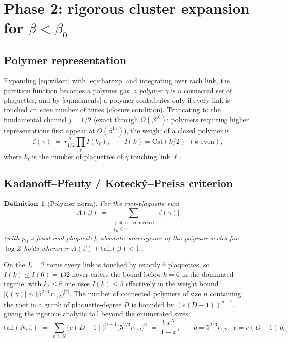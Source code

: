 \documentclass[11pt,a4paper]{article}
\newtheorem{definition}[theorem]{Definition}
\newcommand{\betaZ}{\beta_0}
\begin{document}
\section{Phase 2: rigorous cluster expansion for $\beta < \betaZ$}
\label{sec:phase2}

\subsection{Polymer representation}
\label{sec:polymer}

Expanding \cref{eq:wilson} with \cref{eq:charexp} and integrating over each
link, the partition function becomes a polymer gas: a \emph{polymer} $\gamma$
is a connected set of plaquettes, and by \cref{eq:moments} a polymer
contributes only if every link is touched an \emph{even} number of times
(closure condition).  Truncating to the fundamental channel $j = 1/2$
(exact through $O(\beta^{10})$: polymers requiring higher representations
first appear at $O(\beta^{11})$), the weight of a closed polymer is
\begin{equation}
  \zeta(\gamma) \;=\; r_{1/2}^{|\gamma|} \prod_{\ell} I(k_\ell),
  \qquad I(k) = \mathrm{Cat}(k/2) \ \ (k \text{ even}),
  \label{eq:polyweight}
\end{equation}
where $k_\ell$ is the number of plaquettes of $\gamma$ touching link $\ell$.

\subsection{Kadanoff--Pfeuty / Koteck\'y--Preiss criterion}
\label{sec:kp}

\begin{definition}[Polymer norm]
For the root-plaquette sum
\begin{equation}
  A(\beta) \;=\; \sum_{\substack{\gamma \ \text{closed, connected} \\ p_0
  \in \gamma}} \bigl|\zeta(\gamma)\bigr|
  \label{eq:Anorm}
\end{equation}
(with $p_0$ a fixed root plaquette), absolute convergence of the polymer
series for $\log Z$ holds whenever $A(\beta) + \mathrm{tail}(\beta) < 1$
\cite{kotecky1986, brydges1986}.
\end{definition}

On the $L = 2$ torus every link is touched by exactly $6$ plaquettes, so
$I(k) \le I(6) = 132$ never enters the bound below $k = 6$ in the
dominated regime; with $k_\ell \le 6$ one uses $I(k) \le 5$ effectively in
the weight bound $|\zeta(\gamma)| \le \bigl(5^{2/3}\, r_{1/2}\bigr)^{|\gamma|}$.
The number of connected polymers of size $n$ containing the root in a graph
of plaquette-degree $D$ is bounded by $(e(D-1))^{n-1}$, giving the rigorous
analytic tail beyond the enumerated sizes:
\begin{equation}
  \mathrm{tail}(N, \beta) \;=\; \sum_{n > N} \bigl(e(D-1)\bigr)^{n-1}
  \bigl(5^{2/3} r_{1/2}\bigr)^{n}
  \;=\; \frac{b\, x^{N}}{1 - x}, \qquad
  b = 5^{2/3} r_{1/2},\ x = e(D-1) \, b .
  \label{eq:tail}
\end{equation}
\end{document}
